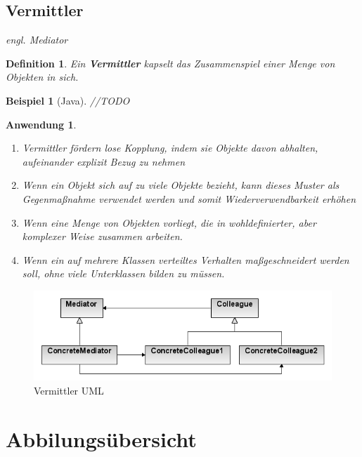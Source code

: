 \documentclass[a4paper]{article}
\theoremstyle{break}
\newtheorem{defi}{Definition}[section]
\newtheorem{ex}{Beispiel}[section]
\newtheorem{why}{Anwendung}[section]
\begin{document}
\newpage
\subsection{Vermittler}
\textit{engl. Mediator}
\begin{defi}
	Ein \textbf{Vermittler} kapselt das Zusammenspiel einer Menge von Objekten in sich.
\end{defi}
\begin{ex}[Java]
	//TODO
\end{ex}
\begin{why}
	\begin{enumerate}
		\item Vermittler fördern lose Kopplung, indem sie Objekte davon	abhalten, aufeinander explizit Bezug zu nehmen
		\item Wenn ein Objekt sich auf zu viele Objekte bezieht, kann dieses Muster als Gegenmaßnahme verwendet werden und somit Wiederverwendbarkeit erhöhen
		\item Wenn eine Menge von Objekten vorliegt, die in wohldefinierter, aber komplexer Weise zusammen arbeiten.
		\item Wenn ein auf mehrere Klassen verteiltes Verhalten maßgeschneidert werden soll, ohne viele Unterklassen bilden zu müssen.
	\end{enumerate}
\end{why}
\begin{figure}[H]
	\centering
	\includegraphics[width=\textwidth]{../diagrams/uml/MediatorPattern.png}
	\caption{Vermittler UML}
\end{figure}


\newpage
\appendix
\section{Abbilungsübersicht}
\listoffigures


	
\end{document}
